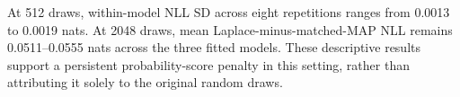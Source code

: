 At 512 draws, within-model NLL SD across eight repetitions ranges from 0.0013 to 0.0019 nats. At 2048 draws, mean Laplace-minus-matched-MAP NLL remains 0.0511--0.0555 nats across the three fitted models. These descriptive results support a persistent probability-score penalty in this setting, rather than attributing it solely to the original random draws.
